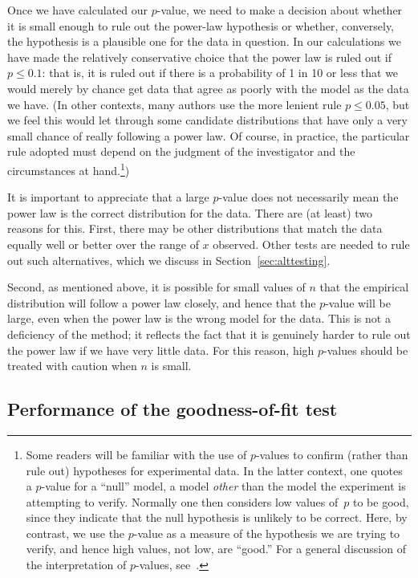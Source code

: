\documentclass[final]{siamltex}
\begin{document}
Once we have calculated our $p$-value, we need to make a decision about
whether it is small enough to rule out the power-law hypothesis or whether,
conversely, the hypothesis is a plausible one for the data in question.  In
our calculations we have made the relatively conservative choice that the
power law is ruled out if $p\le0.1$: that is, it is ruled out if there is a
probability of 1 in 10 or less that we would merely by chance get data that
agree as poorly with the model as the data we have.  (In other contexts,
many authors use the more lenient rule $p\le0.05$, but we feel this would
let through some candidate distributions that have only a very small chance
of really following a power law.  Of course, in practice, the particular
rule adopted must depend on the judgment of the investigator and the
circumstances at hand.\footnote{Some readers will be familiar with the use
 of $p$-values to confirm (rather than rule out) hypotheses for
 experimental data.  In the latter context, one quotes a $p$-value for a
 ``null'' model, a model \emph{other} than the model the experiment is
 attempting to verify.  Normally one then considers low values of~$p$ to
 be good, since they indicate that the null hypothesis is unlikely to be
 correct.  Here, by contrast, we use the $p$-value as a measure of the
 hypothesis we are trying to verify, and hence high values, not low, are
 ``good.''  For a general discussion of the interpretation of $p$-values,
 see~\cite{Mayo-Cox-frequentist}.})

It is important to appreciate that a large $p$-value does not necessarily
mean the power law is the correct distribution for the data.  There are (at
least) two reasons for this.  First, there may be other distributions that
match the data equally well or better over the range of $x$ observed.
Other tests are needed to rule out such alternatives, which we discuss in
Section~\ref{sec:alttesting}.

Second, as mentioned above, it is possible for small values of $n$ that the
empirical distribution will follow a power law closely, and hence that the
$p$-value will be large, even when the power law is the wrong model for the
data.  This is not a deficiency of the method; it reflects the fact that it is
genuinely harder to rule out the power law if we have very little data.
For this reason, high $p$-values should be treated with caution when $n$ is
small.


\subsection{Performance of the goodness-of-fit test}
\label{sec:ptest}
\end{document}
